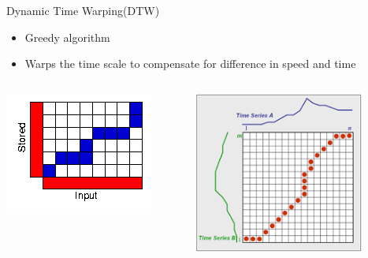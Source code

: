 \documentclass{beamer}
\begin{document}
\begin{frame}{Dynamic Time Warping(DTW)}
\begin{itemize}
	\item Greedy algorithm
	\item Warps the time scale to compensate for difference in speed and time
\end{itemize}
\begin{columns}
	\begin{column}{0.5\textwidth}
		\begin{center}
			\includegraphics[width=\textwidth]{dtw.png}
		\end{center}
	\end{column}
	\begin{column}{0.5\textwidth}  %
		\begin{center}
			\includegraphics[width=0.8\textwidth]{dtwpic.png}
		\end{center}
	\end{column}
\end{columns}
\end{frame}
\end{document}
